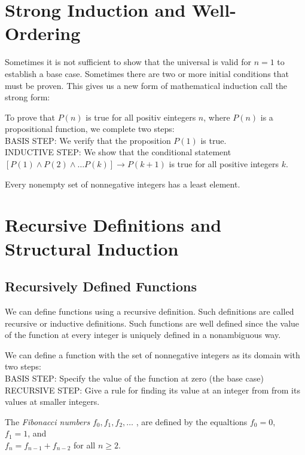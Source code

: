 \section {Strong Induction and Well-Ordering}
Sometimes it is not sufficient to show that the universal is valid for $n=1$ to establish a base case. Sometimes there are two or more initial conditions that must be proven. This gives us a new form of mathematical induction call the strong form:\\
\begin{definition}
To prove that $P(n)$ is true for all positiv eintegers $n$, where $P(n)$ is a propositional function, we complete two steps: \\
BASIS STEP: We verify that the proposition $P(1)$ is true.\\
INDUCTIVE STEP: We show that the conditional statement $[P(1) \land P(2) \land \dots P(k)] \rightarrow P(k+1)$ is true for all positive integers $k$.
\end{definition}

\begin{definition}
Every nonempty set of nonnegative integers has a least element.
\end{definition}
 

\section {Recursive Definitions and Structural Induction}
 
  \subsection {Recursively Defined Functions}
We can define functions using a recursive definition. Such definitions are called recursive or inductive definitions. Such functions are well defined since the value of the function at every integer is uniquely defined in a nonambiguous way.
\begin{definition}
We can define a function with the set of nonnegative integers as its domain with two steps:\\
BASIS STEP: Specify the value of the function at zero (the base case)\\
RECURSIVE STEP: Give a rule for finding its value at an integer from from its values at smaller integers.
\end{definition}

\begin{definition}
The \textit{Fibonacci numbers} $f_0,f_1,f_2, \dots$ , are defined by the equaltions
 $f_0=0$,\\
$f_1=1$, and \\
$f_n=f_{n-1} + f_{n-2}$ for all $n \ge 2$.
\end{definition}








